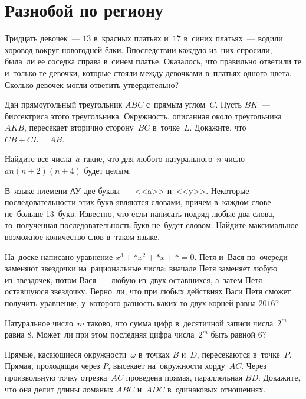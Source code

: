 
\section*{Разнобой по региону}


\begin{problems}

\item
Тридцать девочек~--- $13$ в~красных платьях и~$17$ в~синих платьях~--- водили
хоровод вокруг новогодней ёлки.
Впоследствии каждую из~них спросили, была~ли ее соседка справа в~синем платье.
Оказалось, что правильно ответили те и~только те девочки, которые стояли между
девочками в~платьях одного цвета.
Сколько девочек могли ответить утвердительно?

\item
Дан прямоугольный треугольник $ABC$ с~прямым углом~$C$.
Пусть $BK$~--- биссектриса этого треугольника.
Окружность, описанная около треугольника $AKB$, пересекает вторично
сторону~$BC$ в~точке~$L$.
Докажите, что $CB + CL = AB$.

\item
Найдите все числа~$a$ такие, что для любого натурального~$n$ число
$a n (n + 2) (n + 4)$ будет целым.

\item
В~языке племени АУ две буквы~--- <<a>> и~<<y>>.
Некоторые последовательности этих букв являются словами, причем в~каждом слове
не~больше 13~букв.
Известно, что если написать подряд любые два слова, то~полученная
последовательность букв не~будет словом.
Найдите максимальное возможное количество слов в~таком языке.

\item
На~доске написано уравнение $x^3 + *x^2 + *x + * = 0$.
Петя и~Вася по~очереди заменяют звездочки на~рациональные числа: вначале Петя
заменяет любую из~звездочек, потом Вася~--- любую из~двух оставшихся, а~затем
Петя~--- оставшуюся звездочку.
Верно~ли, что при любых действиях Васи Петя сможет получить уравнение,
у~которого разность каких-то двух корней равна $2016$?

\item
Натуральное число~$m$ таково, что сумма цифр в~десятичной записи числа~$2^m$
равна $8$.
Может~ли при этом последняя цифра числа~$2^m$ быть равной $6$?

\item
Прямые, касающиеся окружности~$\omega$ в~точках $B$ и~$D$, пересекаются
в~точке~$P$.
Прямая, проходящая через $P$, высекает на~окружности хорду~$AC$.
Через произвольную точку отрезка~$AC$ проведена прямая, параллельная $BD$.
Докажите, что она делит длины ломаных $ABC$ и~$ADC$ в~одинаковых
отношениях.


\end{problems}
